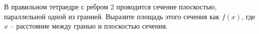 В правильном тетраедре с ребром 2 проводится сечение плоскостью, параллельной одной из гранией. Выразите площадь этого сечения как $f(x)$, где $x$ -- расстояние между гранью и плоскостью сечения.